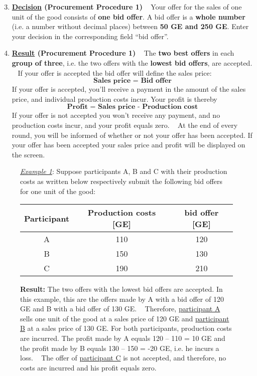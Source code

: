 \documentclass[11pt]{scrartcl}
\begin{document}
\begin{enumerate}[label=\textbf{\upshape(\arabic*\upshape)}] \setcounter{enumi}{2}
	\item \textbf{\underline{Decision} (Procurement Procedure 1)} ~\smallbreak
		Your offer for the sales of one unit of the good consists of \textbf{one bid offer}. A bid offer is a \textbf{whole number} (i.e. a number without decimal places) between \textbf{50 GE and 250 GE}. Enter your decision in the corresponding field \enquote{bid offer}.
	\item \textbf{\underline{Result} (Procurement Procedure 1)} ~\smallbreak
		The \textbf{two best offers} in each \textbf{group of three}, i.e. the two offers with the \textbf{lowest bid offers}, are accepted. ~\smallbreak
		If your offer is accepted the bid offer will define the sales price:
			$$ \textbf{Sales price = Bid offer} $$
		If your offer is accepted, you’ll receive a payment in the amount of the sales price, and individual production costs incur. Your profit is thereby
			$$ \textbf{Profit = Sales price - Production cost} $$
		If your offer is not accepted you won’t receive any payment, and no production costs incur, and your profit equals zero. ~\smallbreak
		At the end of every round, you will be informed of whether or not your offer has been accepted. If your offer has been accepted your sales price and profit will be displayed on the screen.
\end{enumerate}


\begin{figure}[h!] 
	\begin{minipage}[t]{1\linewidth} 
		\begin{tcolorbox}[colback=pink,arc=0pt,colframe=black!25]
			\underline{\textit{Example 1}}: Suppose participants A, B and C with their production costs as written below respectively submit the following bid offers for one unit of the good:
			\begin{center}
				\begin{tabular}{c|cc}
					Participant & Production costs [GE] & bid offer [GE] \\
					\hline
					A			& 110				 	& 120 	\\
					B			& 150	 				& 130   \\
					C			& 190					& 210
				\end{tabular} \bigbreak	
			\end{center}	
			\textbf{Result:} The two offers with the lowest bid offers are accepted. In this example, this are the offers made by A with a bid offer of 120 GE and B with a bid offer of 130 GE. ~\medbreak
			Therefore, \underline{participant A} sells one unit of the good at a sales price of 120 GE and \underline{participant B} at a sales price of 130 GE. For both participants, production costs are incurred. The profit made by A equals 120 – 110 = 10 GE and the profit made by B equals 130 – 150 = -20 GE, i.e. he incurs a loss. ~\medbreak
			The offer of \underline{participant C} is not accepted, and therefore, no costs are incurred and his profit equals zero.      
		\end{tcolorbox} 
	\end{minipage}  
\end{figure}
\end{document}
